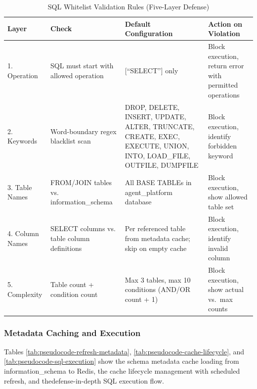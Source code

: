 \begin{table}[H]
\small\singlespacing
\centering
\caption{SQL Whitelist Validation Rules (Five-Layer Defense)}
\label{tab:sql-validation-rules}
\vspace{2mm}

\begin{tabular}{@{}p{2cm}p{3.5cm}p{5cm}p{\dimexpr\textwidth-10.5cm-6\tabcolsep\relax}@{}}
\toprule
\textbf{Layer} & \textbf{Check} & \textbf{Default Configuration} & \textbf{Action on Violation} \\
\midrule
1. Operation    & SQL must start with allowed operation & [``SELECT''] only & Block execution, return error with permitted operations \\
2. Keywords     & Word-boundary regex blacklist scan & DROP, DELETE, INSERT, UPDATE, ALTER, TRUNCATE, CREATE, EXEC, EXECUTE, UNION, INTO, LOAD\_FILE, OUTFILE, DUMPFILE & Block execution, identify forbidden keyword \\
3. Table Names  & FROM/JOIN tables vs. information\_schema & All BASE TABLEs in agent\_platform database & Block execution, show allowed table set \\
4. Column Names & SELECT columns vs. table column definitions & Per referenced table from metadata cache; skip on empty cache & Block execution, identify invalid column \\
5. Complexity   & Table count + condition count & Max 3 tables, max 10 conditions (AND/OR count + 1) & Block execution, show actual vs.\ max counts \\
\bottomrule
\end{tabular}
\end{table}


\subsubsection{Metadata Caching and Execution}

Tables \ref{tab:pseudocode-refresh-metadata}, \ref{tab:pseudocode-cache-lifecycle}, and \ref{tab:pseudocode-sql-execution} show the schema metadata cache loading from information\_schema to Redis, the cache lifecycle management with scheduled refresh, and thedefense-in-depth SQL execution flow.

\vspace{3mm}

